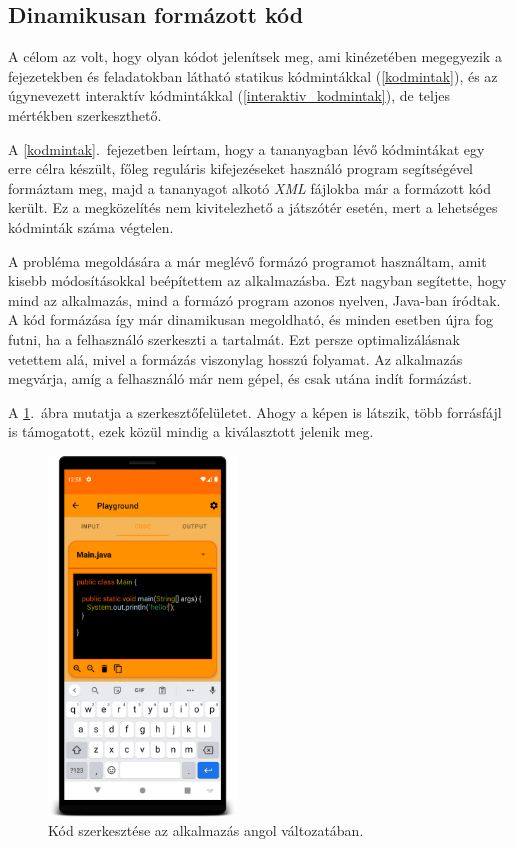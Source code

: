 \documentclass[12pt,a4paper]{article}
\newcommand{\xml}{\textit{XML}\xspace}
\begin{document}
	\subsection{Dinamikusan formázott kód}\label{dinamikusan_formazott_kod}
	
	A célom az volt, hogy olyan kódot jelenítsek meg, ami kinézetében megegyezik a fejezetekben és feladatokban látható statikus kódmintákkal (\ref{kodmintak}), és az úgynevezett interaktív kódmintákkal (\ref{interaktiv_kodmintak}), de teljes mértékben szerkeszthető.  
	
	A \ref{kodmintak}.\ fejezetben leírtam, hogy a tananyagban lévő kódmintákat egy erre célra készült, főleg reguláris kifejezéseket használó program segítségével formáztam meg, majd a tananyagot alkotó \xml fájlokba már a formázott kód került. Ez a megközelítés nem kivitelezhető a játszótér esetén, mert a lehetséges kódminták száma végtelen.
	
	A probléma megoldására a már meglévő formázó programot használtam, amit kisebb módosításokkal beépítettem az alkalmazásba. Ezt nagyban segítette, hogy mind az alkalmazás, mind a formázó program azonos nyelven, Java-ban íródtak. A kód formázása így már dinamikusan megoldható, és minden esetben újra fog futni, ha a felhasználó szerkeszti a tartalmát. Ezt persze optimalizálásnak vetettem alá, mivel a formázás viszonylag hosszú folyamat. Az alkalmazás megvárja, amíg a felhasználó már nem gépel, és csak utána indít formázást.
	
	A \ref{playground_code_figure}.\ ábra mutatja a szerkesztőfelületet. Ahogy a képen is látszik, több forrásfájl is támogatott, ezek közül mindig a kiválasztott jelenik meg.
	
	\begin{figure}[h!]
		\centering
		\includegraphics[width=5cm]{playground_code}
		\caption{Kód szerkesztése az alkalmazás angol változatában.}
		\label{playground_code_figure}
	\end{figure}
\end{document}
